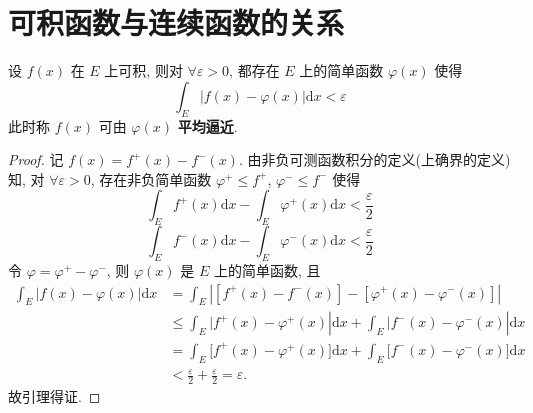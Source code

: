 \documentclass[../../main.tex]{subfiles}
\begin{document}
\section{可积函数与连续函数的关系}

\begin{lemma}\label{lemma:引理4.3}
设 \( f(x) \) 在 \( E \) 上可积, 则对 \( \forall \varepsilon > 0 \), 都存在 \( E \) 上的简单函数 \( \varphi(x) \) 使得
\[
\int_E |f(x) - \varphi(x)|\mathrm{d}x < \varepsilon
\]
此时称 \( f(x) \) 可由 \( \varphi(x) \) \textbf{平均逼近}.
\end{lemma}
\begin{proof}
记 \( f(x) = f^+(x) - f^-(x) \). 由非负可测函数积分的定义(上确界的定义)知, 对 \( \forall \varepsilon > 0 \), 存在非负简单函数 \( \varphi^+ \leqslant f^+ \), \( \varphi^- \leqslant f^- \) 使得
\[
\int_E f^+(x)\mathrm{d}x - \int_E \varphi^+(x)\mathrm{d}x < \frac{\varepsilon}{2}
\]
\[
\int_E f^-(x)\mathrm{d}x - \int_E \varphi^-(x)\mathrm{d}x < \frac{\varepsilon}{2}
\]
令 \( \varphi = \varphi^+ - \varphi^- \), 则 \( \varphi(x) \) 是 \( E \) 上的简单函数, 且
\begin{align*}
\int_E{|f(x)}-\varphi (x)|\mathrm{d}x &=\int_E{\left| \left[ f^+\left( x \right) -f^-\left( x \right) \right] -\left[ \varphi ^+\left( x \right) -\varphi ^-\left( x \right) \right] \right|}
\\
&\leqslant \int_E{|f^+(x)}-\varphi ^+(x)|\mathrm{d}x +\int_E{|f^-(x)}-\varphi ^-(x)|\mathrm{d}x 
\\
&=\int_E{[f^+(x)}-\varphi ^+(x)]\mathrm{d}x +\int_E{[f^-(x)}-\varphi ^-(x)]\mathrm{d}x 
\\
&<\frac{\varepsilon}{2}+\frac{\varepsilon}{2}=\varepsilon .
\end{align*}
故引理得证.
\end{proof}
\end{document}
